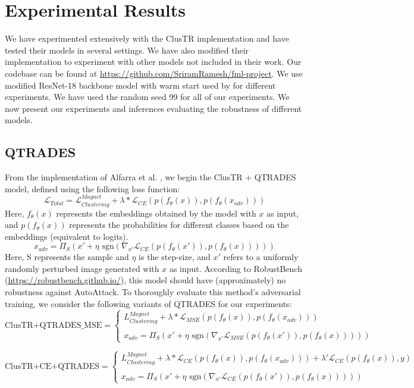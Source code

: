 \section{Experimental Results}\label{sec: experiments}
We have experimented extensively with the ClusTR \cite{Alfarra2020ClusTR} implementation and have tested their models in several settings. We have also modified their implementation to experiment with other models not included in their work. Our codebase can be found at 
\url{https://github.com/SriramRamesh/fml-project}. We use modified ResNet-18 backbone model with warm start used by \cite{Alfarra2020ClusTR} for different experiments. We have used the random seed 99 for all of our experiments.
We now present our experiments and inferences evaluating the robustness of different models.

\subsection{QTRADES}
From the implementation of Alfarra et al. \cite{Alfarra2020ClusTR}, we begin the ClusTR + QTRADES model, defined using the following loss function:
$$\mathcal{L}_{Total} = \mathcal{L}^{Magnet}_{Clustering} + \lambda*\mathcal{L}_{CE}(p(f_{\theta}(x)), p(f_{\theta}(x_{adv})))$$
Here, $f_{\theta}(x)$ represents the embeddings obtained by the model with $x$ as input, and $p(f_{\theta}(x))$ represents the probabilities for different classes based on the embeddings (equivalent to logits).
$$x_{adv} = \Pi_{S}(x' + \eta 
\text{ sgn}(\nabla_{x'}\mathcal{L}_{CE}(p(f_{\theta}(x')), p(f_{\theta}(x)))))$$
Here, S represents the sample and $\eta$ is the step-size, and $x'$ refers to a uniformly randomly perturbed image generated with $x$ as input.
According to RobustBench (\url{https://robustbench.github.io/}), this model should have (approximately) no robustness against AutoAttack. To thoroughly evaluate this method's adversarial training, we consider the following variants of QTRADES for our experiments:
\[\text{ClusTR+QTRADES\_MSE} = \begin{cases}L^{Magnet}_{Clustering} + \lambda*\mathcal{L}_{MSE}(p(f_{\theta}(x)), p(f_{\theta}(x_{adv})))\\
\\
x_{adv} = \Pi_{S}(x' + \eta \text{ sgn}(\nabla_{x'}\mathcal{L}_{MSE}(p(f_{\theta}(x')), p(f_{\theta}(x)))))\end{cases}\]

\[\text{ClusTR+CE+QTRADES} = \begin{cases}L^{Magnet}_{Clustering} + \lambda*\mathcal{L}_{CE}(p(f_{\theta}(x)), p(f_{\theta}(x_{adv}))) + \lambda'\mathcal{L}_{CE}(p(f_{\theta}(x)),y)\\
\\
x_{adv} = \Pi_{S}(x' + \eta \text{ sgn}(\nabla_{x'}\mathcal{L}_{CE}(p(f_{\theta}(x')), p(f_{\theta}(x)))))\end{cases}\]

